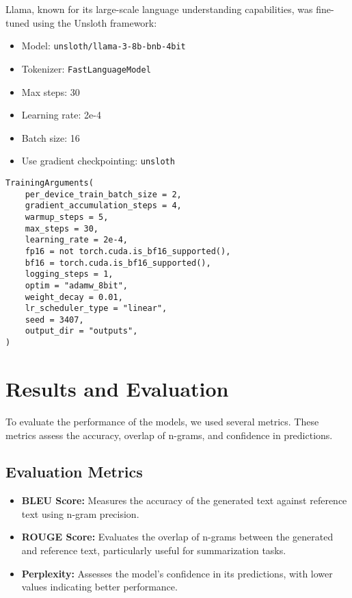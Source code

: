 \documentclass[conference]{IEEEtran}
\begin{document}
            Llama, known for its large-scale language understanding capabilities, was fine-tuned using the Unsloth framework:
            \begin{itemize}
                \item Model: \texttt{unsloth/llama-3-8b-bnb-4bit}
                \item Tokenizer: \texttt{FastLanguageModel}
                \item Max steps: 30
                \item Learning rate: 2e-4
                \item Batch size: 16
                \item Use gradient checkpointing: \texttt{unsloth}
            \end{itemize}

            \begin{verbatim}
TrainingArguments(
    per_device_train_batch_size = 2,
    gradient_accumulation_steps = 4,
    warmup_steps = 5,
    max_steps = 30,
    learning_rate = 2e-4,
    fp16 = not torch.cuda.is_bf16_supported(),
    bf16 = torch.cuda.is_bf16_supported(),
    logging_steps = 1,
    optim = "adamw_8bit",
    weight_decay = 0.01,
    lr_scheduler_type = "linear",
    seed = 3407,
    output_dir = "outputs",
)
            \end{verbatim}

\section{Results and Evaluation}

    To evaluate the performance of the models, we used several metrics. These metrics assess the accuracy, overlap of n-grams, and confidence in predictions.
    \subsection{Evaluation Metrics}

        \begin{itemize}
            \item \textbf{BLEU Score:} Measures the accuracy of the generated text against reference text using n-gram precision.
            \item \textbf{ROUGE Score:} Evaluates the overlap of n-grams between the generated and reference text, particularly useful for summarization tasks.
            \item \textbf{Perplexity:} Assesses the model's confidence in its predictions, with lower values indicating better performance.
        \end{itemize}
\end{document}
